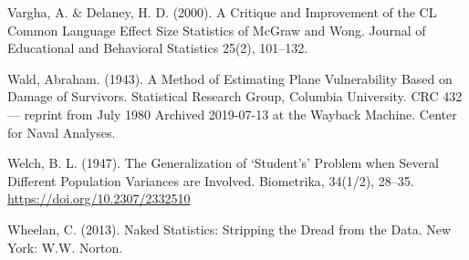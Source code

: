 \documentclass[]{book}
\begin{document}
Vargha, A. \& Delaney, H. D. (2000). A Critique and Improvement of the CL Common Language Effect Size Statistics of McGraw and Wong. Journal of Educational and Behavioral Statistics 25(2), 101--132.

Wald, Abraham. (1943). A Method of Estimating Plane Vulnerability Based on Damage of Survivors. Statistical Research Group, Columbia University. CRC 432 --- reprint from July 1980 Archived 2019-07-13 at the Wayback Machine. Center for Naval Analyses.

Welch, B. L. (1947). The Generalization of `Student's' Problem when Several Different Population Variances are Involved. Biometrika, 34(1/2), 28--35. \url{https://doi.org/10.2307/2332510}

Wheelan, C. (2013). Naked Statistics: Stripping the Dread from the Data. New York: W.W. Norton.


\end{document}
